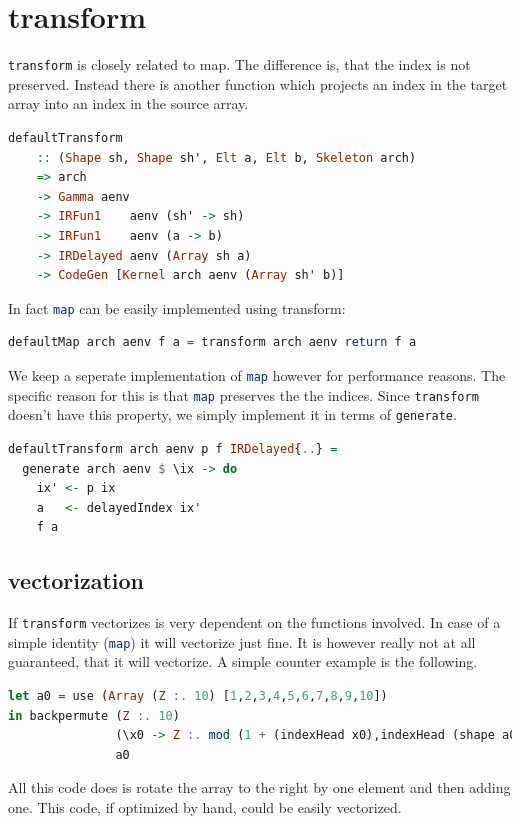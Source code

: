 \documentclass[a4paper,bibliography=totocnumbered,parskip,headsepline]{scrbook}
\begin{document}
\section{transform}
\lstinline[language=haskell]!transform! is closely related to map.
The difference is, that the index is not preserved.
Instead there is another function which projects an index in the target array into an index in the source array.
\begin{lstlisting}[language=haskell]
defaultTransform
    :: (Shape sh, Shape sh', Elt a, Elt b, Skeleton arch)
    => arch
    -> Gamma aenv
    -> IRFun1    aenv (sh' -> sh)
    -> IRFun1    aenv (a -> b)
    -> IRDelayed aenv (Array sh a)
    -> CodeGen [Kernel arch aenv (Array sh' b)]
\end{lstlisting}
In fact \lstinline[language=haskell]!map! can be easily implemented using transform:
\begin{lstlisting}[language=haskell]
defaultMap arch aenv f a = transform arch aenv return f a
\end{lstlisting}
We keep a seperate implementation of \lstinline[language=haskell]!map! however for performance reasons.
The specific reason for this is that \lstinline[language=haskell]!map! preserves the the indices.
Since \lstinline[language=haskell]!transform! doesn't have this property, we simply implement it in terms of \lstinline[language=haskell]!generate!.
\begin{lstlisting}[language=haskell]
defaultTransform arch aenv p f IRDelayed{..} =
  generate arch aenv $ \ix -> do
    ix' <- p ix
    a   <- delayedIndex ix'
    f a
\end{lstlisting}

\subsection{vectorization}
If \lstinline[language=haskell]!transform! vectorizes is very dependent on the functions involved.
In case of a simple identity (\lstinline[language=haskell]!map!) it will vectorize just fine.
It is however really not at all guaranteed, that it will vectorize.
A simple counter example is the following.
\begin{lstlisting}[language=haskell]
let a0 = use (Array (Z :. 10) [1,2,3,4,5,6,7,8,9,10])
in backpermute (Z :. 10) 
               (\x0 -> Z :. mod (1 + (indexHead x0),indexHead (shape a0)))
               a0
\end{lstlisting}
All this code does is rotate the array to the right by one element and then adding one.
This code, if optimized by hand, could be easily vectorized.
\end{document}
